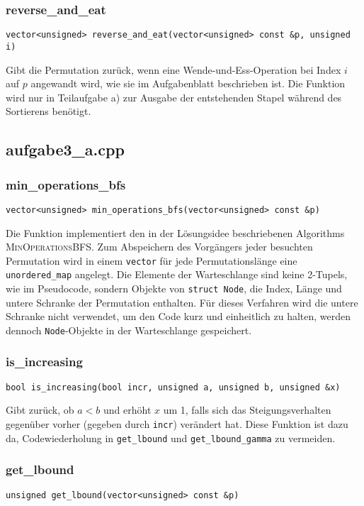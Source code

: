 \documentclass[a4paper, 10pt, ngerman]{article}
\begin{document}
\subsubsection{reverse\_and\_eat}
\verb|vector<unsigned> reverse_and_eat(vector<unsigned> const &p, unsigned i)|
\medskip

\noindent Gibt die Permutation zurück, wenn eine Wende-und-Ess-Operation bei Index $i$ auf $p$ angewandt wird, wie sie im Aufgabenblatt beschrieben ist. Die Funktion wird nur in Teilaufgabe a) zur Ausgabe der entstehenden Stapel während des Sortierens benötigt.

\subsection{aufgabe3\_a.cpp}

\subsubsection{min\_operations\_bfs}
\verb|vector<unsigned> min_operations_bfs(vector<unsigned> const &p)|
\medskip

\noindent Die Funktion implementiert den in der Lösungsidee beschriebenen Algorithms \textsc{MinOperationsBFS}. Zum Abspeichern des Vorgängers jeder besuchten Permutation wird in einem \verb|vector| für jede Permutationslänge eine \verb|unordered_map| angelegt. Die Elemente der Warteschlange sind keine 2-Tupels, wie im Pseudocode, sondern Objekte von \verb|struct Node|, die Index, Länge und untere Schranke der Permutation enthalten. Für dieses Verfahren wird die untere Schranke nicht verwendet, um den Code kurz und einheitlich zu halten, werden dennoch \verb|Node|-Objekte in der Warteschlange gespeichert.

\subsubsection{is\_increasing}
\verb|bool is_increasing(bool incr, unsigned a, unsigned b, unsigned &x)|
\medskip

\noindent Gibt zurück, ob $a < b$ und erhöht $x$ um 1, falls sich das Steigungsverhalten gegenüber vorher (gegeben durch \verb|incr|) verändert hat. Diese Funktion ist dazu da, Codewiederholung in \verb|get_lbound| und \verb|get_lbound_gamma| zu vermeiden.

\subsubsection{get\_lbound}
\verb|unsigned get_lbound(vector<unsigned> const &p)|
\medskip
\end{document}
